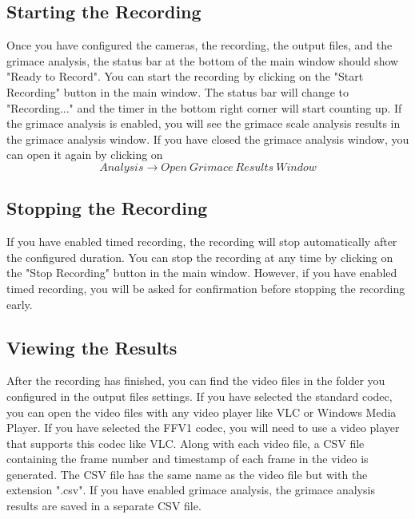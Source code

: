 \subsection{Starting the Recording}
Once you have configured the cameras, the recording, the output files, and the grimace analysis, 
the status bar at the bottom of the main window should show "Ready to Record".
You can start the recording by clicking on the "Start Recording" button in the main window.
The status bar will change to "Recording..." and the timer in the bottom right corner will start counting up.  
If the grimace analysis is enabled, you will see the grimace scale analysis results in the grimace analysis window.  
If you have closed the grimace analysis window, 
you can open it again by clicking on \[Analysis \rightarrow Open\ Grimace\ Results\ Window\]

\subsection{Stopping the Recording}
If you have enabled timed recording, the recording will stop automatically after the configured duration.
You can stop the recording at any time by clicking on the "Stop Recording" button in the main window. 
However, if you have enabled timed recording, you will be asked for confirmation before stopping the recording early.

\subsection{Viewing the Results}
After the recording has finished, you can find the video files in the folder you configured in the output files settings.  
If you have selected the standard codec, you can open the video files with any video player like VLC or Windows Media Player.
If you have selected the FFV1 codec, you will need to use a video player that supports this codec like VLC.  
Along with each video file, a CSV file containing the frame number and timestamp of each frame in the video is generated. 
The CSV file has the same name as the video file but with the extension ".csv".
If you have enabled grimace analysis, the grimace analysis results are saved in a separate CSV file.